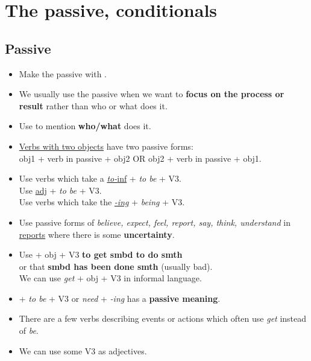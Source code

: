 \section{The passive, conditionals}

\subsection{Passive}
\begin{itemize}
    \item Make the passive with .
    \item We usually use the passive when we want to \textbf{focus on the process or result}
    rather than who or what does it.
    \item[\doot] Use  to mention \textbf{who/what} does it.
    \item[\doot] \underline{Verbs with two objects} have two passive forms:\\
    obj1 + verb in passive + obj2 OR obj2 + verb in passive + obj1.
    \item[\doot] Use verbs which take a \underline{\textit{to-}inf} + \textit{to be} + V3.\\
    Use \underline{adj} + \textit{to be} + V3.\\
    Use verbs which take the \underline{\textit{-ing}} + \textit{being} + V3.
    \item[\doot] Use passive forms of \textit{believe, expect, feel, report, say, think, understand}
    in \underline{reports} where there is some \textbf{uncertainty}.
    \item[\doot] Use  + obj + V3 \textbf{to get smbd to do smth}\\
    or that \textbf{smbd has been done smth} (usually bad).\\
    We can use \textit{get} + obj + V3 in informal language.
    \item[\doot]  + \textit{to be} + V3 or \textit{need} + \textit{-ing} has a \textbf{passive meaning}.
    \item[\aast] There are a few verbs describing events or actions which often use \textit{get} instead of \textit{be}.
    \item[\aast] We can use some V3 as adjectives.
\end{itemize}

